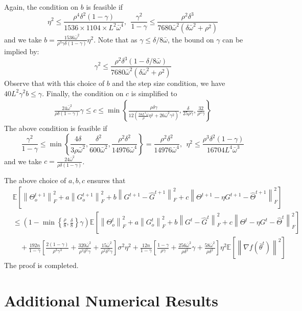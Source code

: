\documentclass[10pt]{article} %
\theoremstyle{plain}
\theoremstyle{definition}
\theoremstyle{remark}
\newcommand{\bw}{\bar{\omega}}
\newcommand{\norm}[1]{\left\| #1 \right\|}
\newcommand{\nl}{\nonumber\\}
\begin{document}
Again, the condition on $b$ is feasible if 
\[
\eta^2 \leq \frac{ \rho^4 \delta^2 (1-\gamma) }{ 1536 \times 1104 \times L^2 \bw^4 }, ~~ \frac{\gamma^2}{1-\gamma} \leq \frac{ \rho^2 \delta^3 }{ 7680 \bw^2 ( \delta \bw^2 + \rho^2 ) }
\]
and we take $b = \frac{1536 \bw^2}{\rho^3 \gamma \delta (1-\gamma)} \eta^2$. Note that as $\gamma \leq \delta / 8 \bw$, the bound on $\gamma$ can be implied by:
\[
\gamma^2 \leq \frac{ \rho^2 \delta^3 (1 - \delta/8\bw) }{ 7680 \bw^2 ( \delta \bw^2 + \rho^2 ) }
\]
Observe that with this choice of $b$ and the step size condition, we have $40 L^2 \gamma^2 b \leq \gamma$. Finally, the condition on $c$ is simplified to 
\begin{align*}
    \frac{24 \bw^2}{\rho \delta (1-\gamma)} \gamma \leq c \leq \min \left\{ \frac{ \rho \delta \gamma }{ 12 ( \frac{58 L^4 \bw}{ \rho } \eta^2 + 26 \bw^2 \gamma^2 ) }, \frac{\delta}{ 25 \rho \gamma }, \frac{32}{\rho^2 \gamma} \right\}
\end{align*}
The above condition is feasible if 
\[
\frac{\gamma^2}{1-\gamma} \leq \min \left\{ \frac{4 \delta}{3 \rho \bw^2}, \frac{ \delta^2 }{ 600 \bw^2 }, \frac{ \rho^2 \delta^2 }{ 14976 \bw^4 } \right\} = \frac{ \rho^2 \delta^2 }{ 14976 \bw^4 } , ~~\eta^2 \leq \frac{ \rho^3 \delta^2 (1-\gamma) }{ 16704 L^4 \bw^3 }  
\]
and we take $c = \frac{24 \bw^2}{\rho \delta (1-\gamma)}$. 

The above choice of $a,b,c$ ensures that
\begin{align}
& \mathbb{E} \left[ \norm{\Theta_o^{t+1}}_F^2 + a \norm{ G_o^{t+1} }_F^2 + b \norm{ G^{t+1} - \hat{G}^{t+1} }_F^2 + c \norm{ \Theta^{t+1} - \eta G^{t+1} - \hat{\Theta}^{t+1} }_F^2 \right] \nl
& \leq \left( 1 - \min\left\{ \frac{\rho}{8}, \frac{ \delta }{8} \right\} \gamma \right) \mathbb{E} \left[ \norm{\Theta_o^{t}}_F^2 + a \norm{ G_o^{t} }_F^2 + b \norm{ G^{t} - \hat{G}^{t} }_F^2 + c \norm{ \Theta^{t} - \eta G^{t} - \hat{\Theta}^{t} }_F^2 \right] \nl 
& \quad + \frac{192n}{1-\gamma} \left[ \frac{ 2(1-\gamma) }{ \rho^3 \gamma^3 } + \frac{320 \bw^2}{\rho^3 \delta^2 \gamma } + \frac{15 \bw^2}{\rho^2 \delta^2 \gamma } \right] \sigma^2 \eta^2
+ \frac{12n}{1-\gamma} \left[ \frac{ 1-\gamma }{ \rho \gamma } + \frac{256 \bw^2}{\rho \delta^2 } \gamma +  \frac{58 \bw^2 }{\rho \delta^2 } \right]  \eta^2 \mathbb{E} \left[ \norm{ \nabla f( \bar{\theta}^t ) }^2 \right] \nonumber
\end{align}
The proof is completed. 

 \newpage
\section{Additional Numerical Results}\label{app:more_plots}
\end{document}
